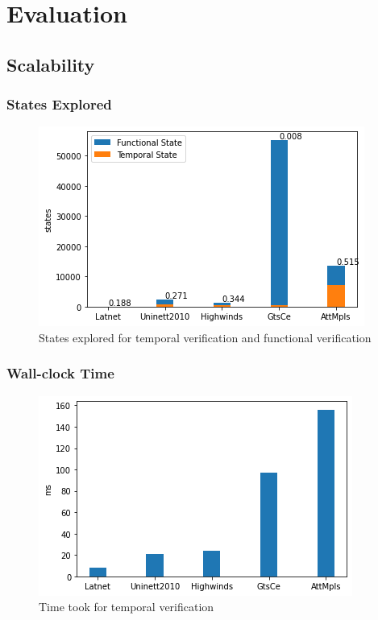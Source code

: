 \documentclass[10pt,sigconf,letterpaper,anonymous,nonacm]{acmart}
\begin{document}

\section{Evaluation}
\subsection{Scalability}

\subsubsection{States Explored}
\begin{figure}[h]
    \centering
    \includegraphics[scale=0.5]{states}
    \caption{States explored for temporal verification and functional verification}
    \label{fig:states}
\end{figure}

\subsubsection{Wall-clock Time}
\begin{figure}[h]
    \centering
    \includegraphics[scale=0.5]{wallclock}
    \caption{Time took for temporal verification}
    \label{fig:wallclock}
\end{figure}
\end{document}
